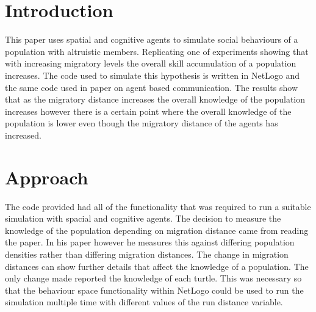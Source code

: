 \documentclass[12pt, letterpaper]{article}
\title{}
\author{William Ewart}
\date{March 2017}
\begin{document}
\begin{titlingpage}
\maketitle
\tableofcontents
\end{titlingpage}
\newpage
\begin{multicols}{2}
\section{Introduction}
This paper uses spatial and cognitive agents to simulate social behaviours of a population with altruistic members. Replicating one of \cite{Powell} experiments showing that with increasing migratory levels the overall skill accumulation of a population increases. The code used to simulate this hypothesis is written in NetLogo and the same code used in \cite{Cace} paper on agent based communication. The results show that as the migratory distance increases the overall knowledge of the population increases however there is a certain point where the overall knowledge of the population is lower even though the migratory distance of the agents has increased. 
\section{Approach}
The code provided had all of the functionality that was required to run a suitable simulation with spacial and cognitive agents. The decision to measure the knowledge of the population depending on migration distance came from reading the \citep{Powell} paper. In his paper however he measures this against differing population densities rather than differing migration distances. The change in migration distances can show further details that affect the knowledge of a population. The only change made reported the knowledge of each turtle. This was necessary so that the behaviour space functionality within NetLogo could be used to run the simulation multiple time with different values of the run distance variable. 

\end{multicols}
\end{document}
